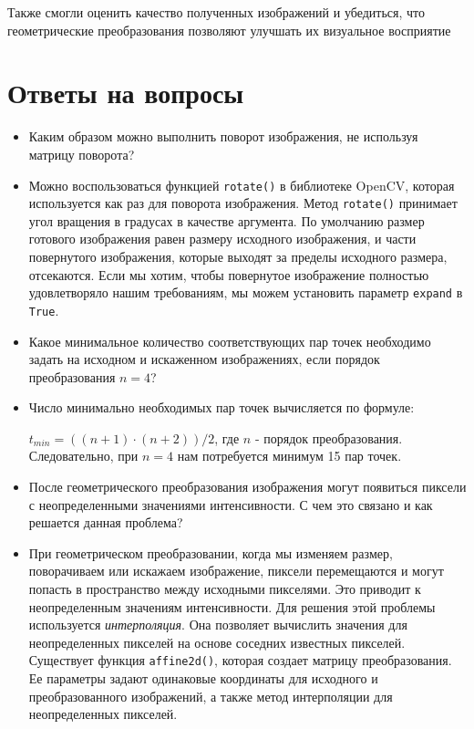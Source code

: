 Также смогли оценить качество полученных изображений и убедиться, что геометрические преобразования позволяют улучшать их визуальное восприятие

\section{Ответы на вопросы}

\setcounter{question}{0}

\newcommand{\question}[1]{\item[Q\refstepcounter{question}\thequestion.] #1}
\newcommand{\answer}[1]{\item[A\thequestion.] #1}

\begin{itemize}

\question{Каким образом можно выполнить поворот изображения, не используя матрицу поворота?}
\answer{Можно воспользоваться функцией \texttt{rotate()} в библиотеке OpenCV, которая используется как раз для поворота изображения. Метод \texttt{rotate()} принимает угол вращения в градусах в качестве аргумента. 
По умолчанию размер готового изображения равен размеру исходного изображения, и части повернутого изображения, которые выходят за пределы исходного размера, отсекаются.
Если мы хотим, чтобы повернутое изображение полностью удовлетворяло нашим требованиям, мы можем установить параметр \texttt{expand} в \texttt{True}.}

\question{Какое минимальное количество соответствующих пар точек необходимо задать на исходном и искаженном изображениях, если порядок преобразования $n = 4$?}
\answer{Число минимально необходимых пар точек вычисляется по формуле:

$t_{min} = ((n+1)\cdot(n+2))/2$, 
где $n$ - порядок преобразования. Следовательно, при $n = 4$ нам потребуется минимум 15 пар точек.}

\question{После геометрического преобразования изображения могут появиться пиксели с неопределенными значениями интенсивности. С чем это связано и как решается данная проблема?}
\answer{При геометрическом преобразовании, когда мы изменяем размер, поворачиваем или искажаем изображение, пиксели перемещаются и могут попасть в пространство между исходными пикселями. Это приводит к неопределенным значениям интенсивности. 
Для решения этой проблемы используется \textit{интерполяция}. Она позволяет вычислить значения для неопределенных пикселей на основе соседних известных пикселей.
Существует функция \texttt{affine2d()}, которая создает матрицу преобразования. Ее параметры задают одинаковые координаты для исходного и преобразованного изображений, а также метод интерполяции для неопределенных пикселей.}

\end{itemize}

